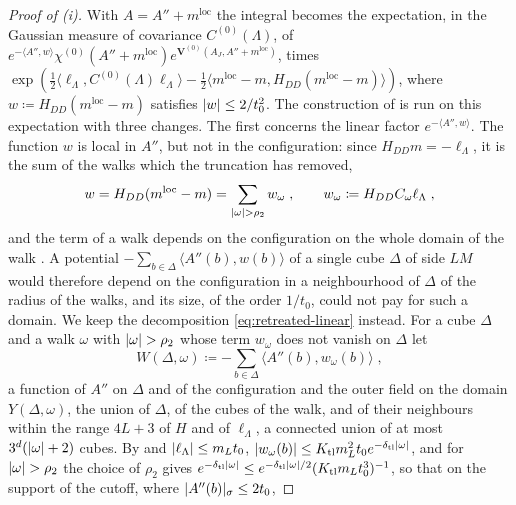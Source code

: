 \documentclass[11pt]{preprint}
\DeclarePairedDelimiter{\abs}{\lvert}{\rvert}
\numberwithin{equation}{section}
\theoremstyle{definition}
\theoremstyle{remark}
\theoremstyle{plain}
\begin{document}
\begin{proof}[Proof of (i)]
With $A = A'' + m^{\mathrm{loc}}$ the integral becomes the expectation, in the Gaussian measure of covariance $C^{(0)}(\Lambda)$, of $e^{-\langle A'', w\rangle}\chi^{(0)}(A'' + m^{\mathrm{loc}})e^{\mathbf V^{(0)}(A_J, A'' + m^{\mathrm{loc}})}$, times $\exp(\frac12\langle\ell_\Lambda, C^{(0)}(\Lambda)\ell_\Lambda\rangle - \frac12\langle m^{\mathrm{loc}} - m, H_{DD}(m^{\mathrm{loc}} - m)\rangle)$, where $w \coloneqq H_{DD}(m^{\mathrm{loc}} - m)$ satisfies $\abs{w} \leq 2/t_0^2$. The construction of \cite[(2.1)--(2.13), pp.~12--14]{BalabanRG2} is run on this expectation with three changes. The first concerns the linear factor $e^{-\langle A'', w\rangle}$. The function $w$ is local in $A''$, but not in the configuration: since $H_{DD}m = -\ell_\Lambda$, it is the sum of the walks which the truncation has removed,
\begin{equation}\label{eq:retreated-linear}
    w = H_{DD}(m^{\mathrm{loc}} - m) = \sum_{\abs\omega > \rho_2}w_\omega\;,
    \qquad
    w_\omega \coloneqq H_{DD}C_\omega\ell_\Lambda\;,
\end{equation}
and the term of a walk depends on the configuration on the whole domain of the walk \cite[Theorem~3.10, p.~416]{BalabanPBG}. A potential $-\sum_{b \in \Delta}\langle A''(b), w(b)\rangle$ of a single cube $\Delta$ of side $LM$ would therefore depend on the configuration in a neighbourhood of $\Delta$ of the radius of the walks, and its size, of the order $1/t_0$, could not pay for such a domain. We keep the decomposition \eqref{eq:retreated-linear} instead. For a cube $\Delta$ and a walk $\omega$ with $\abs\omega > \rho_2$ whose term $w_\omega$ does not vanish on $\Delta$ let
\begin{equation}\label{eq:retreated-linear-potential}
    W(\Delta, \omega) \coloneqq -\sum_{b \in \Delta}\langle A''(b), w_\omega(b)\rangle\;,
\end{equation}
a function of $A''$ on $\Delta$ and of the configuration and the outer field on the domain $Y(\Delta, \omega)$, the union of $\Delta$, of the cubes of the walk, and of their neighbours within the range $4L + 3$ of $H$ and of $\ell_\Lambda$, a connected union of at most $3^d(\abs\omega + 2)$ cubes. By \cite[(3.108)]{BalabanPBG} and $\abs{\ell_\Lambda} \leq m_Lt_0$, $\abs{w_\omega(b)} \leq K_{\mathrm{tl}}m_L^2t_0e^{-\delta_{\mathrm{tl}}\abs\omega}$, and for $\abs\omega > \rho_2$ the choice of $\rho_2$ gives $e^{-\delta_{\mathrm{tl}}\abs\omega} \leq e^{-\delta_{\mathrm{tl}}\abs\omega/2}(K_{\mathrm{tl}}m_Lt_0^3)^{-1}$, so that on the support of the cutoff, where $\abs{A''(b)}_\sigma \leq 2t_0$,

\end{proof}
\end{document}
